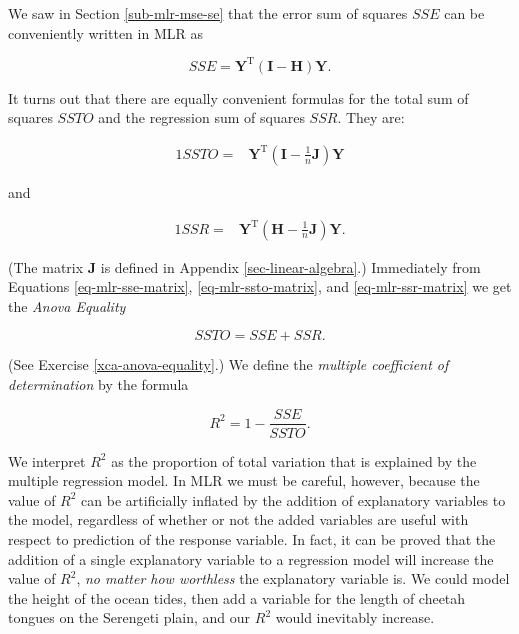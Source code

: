 \documentclass[]{book}
\numberwithin{equation}{chapter}
\numberwithin{figure}{chapter}
\theoremstyle{plain}
\theoremstyle{definition}
\theoremstyle{remark}
\theoremstyle{definition}
\theoremstyle{definition}
\theoremstyle{remark}
\begin{document}
We saw in Section \ref{sub-mlr-mse-se} that the error sum of squares
\(SSE\) can be conveniently written in MLR as

\begin{equation}
\label{eq-mlr-sse-matrix}
SSE=\mathbf{Y}^{\mathrm{T}}(\mathbf{I}-\mathbf{H})\mathbf{Y}.
\end{equation}

It turns out that there are equally convenient formulas for the total
sum of squares \(SSTO\) and the regression sum of squares \(SSR\). They
are:

\begin{alignat}{1}
\label{eq-mlr-ssto-matrix}
SSTO= & \mathbf{Y}^{\mathrm{T}}\left(\mathbf{I}-\frac{1}{n}\mathbf{J}\right)\mathbf{Y}
\end{alignat}

and

\begin{alignat}{1}
\label{eq-mlr-ssr-matrix}
SSR= & \mathbf{Y}^{\mathrm{T}}\left(\mathbf{H}-\frac{1}{n}\mathbf{J}\right)\mathbf{Y}.
\end{alignat}

(The matrix \(\mathbf{J}\) is defined in Appendix
\ref{sec-linear-algebra}.) Immediately from Equations
\eqref{eq-mlr-sse-matrix}, \eqref{eq-mlr-ssto-matrix}, and
\eqref{eq-mlr-ssr-matrix} we get the \emph{Anova Equality}

\begin{equation} 
SSTO=SSE+SSR.
\end{equation}

(See Exercise \ref{xca-anova-equality}.) We define the \emph{multiple
coefficient of determination} by the formula

\begin{equation} 
R^{2}=1-\frac{SSE}{SSTO}.
\end{equation}

We interpret \(R^{2}\) as the proportion of total variation that is
explained by the multiple regression model. In MLR we must be careful,
however, because the value of \(R^{2}\) can be artificially inflated by
the addition of explanatory variables to the model, regardless of
whether or not the added variables are useful with respect to prediction
of the response variable. In fact, it can be proved that the addition of
a single explanatory variable to a regression model will increase the
value of \(R^{2}\), \emph{no matter how worthless} the explanatory
variable is. We could model the height of the ocean tides, then add a
variable for the length of cheetah tongues on the Serengeti plain, and
our \(R^{2}\) would inevitably increase.
\end{document}
